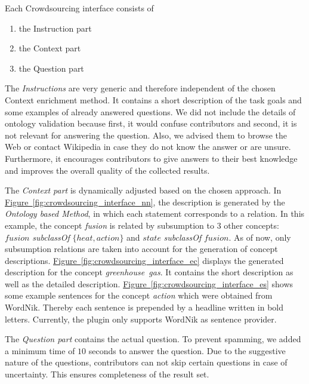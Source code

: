 Each Crowdsourcing interface consists of
\begin{enumerate}
		\item the Instruction part
		\item the Context part
		\item the Question part
\end{enumerate}

The \emph{Instructions} are very generic and therefore independent of the chosen Context enrichment method. It contains a short description of the task goals and some examples of already answered questions. We did not include the details of ontology validation because first, it would confuse contributors and second, it is not relevant for answering the question. Also, we advised them to browse the Web or contact Wikipedia in case they do not know the answer or are unsure. Furthermore, it encourages contributors to give answers to their best knowledge and improves the overall quality of the collected results.  

The \emph{Context part} is dynamically adjusted based on the chosen approach.
In \hyperref[fig:crowdsourcing_interface_nn]{Figure~\ref*{fig:crowdsourcing_interface_nn}}, the description is generated by the \emph{Ontology based Method}, in which each statement corresponds to a relation. In this example, the concept \emph{fusion} is related by subsumption to 3 other concepts: $ fusion$  \emph{subclassOf} $ \{ heat, action \} $ and $ state $ \emph{subclassOf} $ fusion $. As of now, only subsumption relations are taken into account for the generation of concept descriptions. 
\hyperref[fig:crowdsourcing_interface_ec]{Figure~\ref*{fig:crowdsourcing_interface_ec}} displays the generated description for the concept \emph{greenhouse~gas}. It contains the short description as well as the detailed description.
\hyperref[fig:crowdsourcing_interface_es]{Figure~\ref*{fig:crowdsourcing_interface_es}} shows some example sentences for the concept \emph{action} which were obtained from WordNik. Thereby each sentence is prepended by a headline written in bold letters. Currently, the plugin only supports WordNik as sentence provider. 

The \emph{Question part} contains the actual question. To prevent spamming, we added a minimum time of $10$ seconds to answer the question. Due to the suggestive nature of the questions, contributors can not skip certain questions in case of uncertainty. This ensures completeness of the result set.

